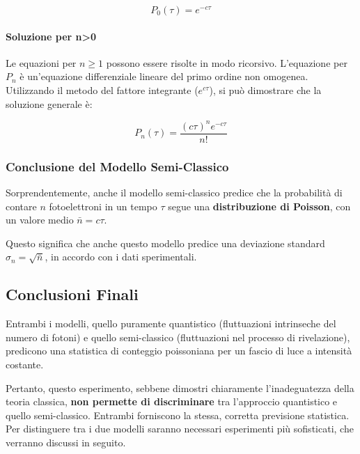 \begin{equation}
 P_0(\tau) = e^{-c\tau}
\end{equation}

\paragraph{Soluzione per n>0}
Le equazioni per $n \ge 1$ possono essere risolte in modo ricorsivo. L'equazione per $P_n$ è un'equazione differenziale lineare del primo ordine non omogenea. Utilizzando il metodo del fattore integrante ($e^{c\tau}$), si può dimostrare che la soluzione generale è:

\begin{equation}
 P_n(\tau) = \frac{(c\tau)^n e^{-c\tau}}{n!}
\end{equation}

\subsubsection*{Conclusione del Modello Semi-Classico}
Sorprendentemente, anche il modello semi-classico predice che la probabilità di contare $n$ fotoelettroni in un tempo $\tau$ segue una \textbf{distribuzione di Poisson}, con un valore medio $\bar{n} = c\tau$.

Questo significa che anche questo modello predice una deviazione standard $\sigma_n = \sqrt{\bar{n}}$, in accordo con i dati sperimentali.

\subsection{Conclusioni Finali}

Entrambi i modelli, quello puramente quantistico (fluttuazioni intrinseche del numero di fotoni) e quello semi-classico (fluttuazioni nel processo di rivelazione), predicono una statistica di conteggio poissoniana per un fascio di luce a intensità costante.

Pertanto, questo esperimento, sebbene dimostri chiaramente l'inadeguatezza della teoria classica, \textbf{non permette di discriminare} tra l'approccio quantistico e quello semi-classico. Entrambi forniscono la stessa, corretta previsione statistica. Per distinguere tra i due modelli saranno necessari esperimenti più sofisticati, che verranno discussi in seguito.
